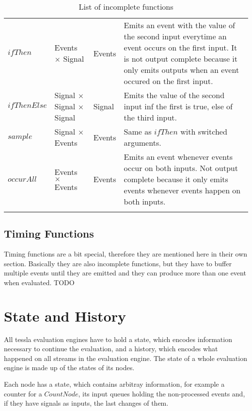 \begin{longtable}{lp{3cm}lp{6cm}}
  \(\mathit{ifThen}\)           & Events \(\times\) Signal  & Events  & Emits an event with the value of the second input everytime an event occurs on the first input. It is not output complete because it only emits outputs when an event occured on the first input. \\
  \(\mathit{ifThenElse}\)       & Signal \(\times\) Signal \newline \(\times\) Signal  & Signal  & Emits the value of the second input inf the first is true, else of the third input.\\
  \(\mathit{sample}\)           & Signal \(\times\) Events  & Events  & Same as \(\mathit{ifThen}\) with switched arguments. \\
  \(\mathit{occurAll}\)         & Events \(\times\) Events  & Events  & Emits an event whenever events occur on both inputs. Not output complete because it only emits events whenever events happen on both inputs.\\
  \caption{List of incomplete functions}
\label{table:incomplete_functions}
\end{longtable}

\subsection{Timing Functions}
\label{sec:definitions:tessla_functions:timing}

Timing functions are a bit special, therefore they are mentioned here in their own section.
Basically they are also incomplete functions, but they have to buffer multiple events until they are emitted and they can produce more than one event when evaluated.
TODO

\section{State and History}
\label{sec:definitions:state}

All \gls{tessla} evaluation engines have to hold a state, which encodes information necessary to continue the evaluation, and a history, which encodes what happened on all streams in the evaluation engine.
The state of a whole evaluation engine is made up of the states of its nodes.

Each node has a state, which contains arbitray information, for example a counter for a \(\mathit{CountNode}\), its input queues holding the non-processed events and, if they have signals as inputs, the last changes of them.

